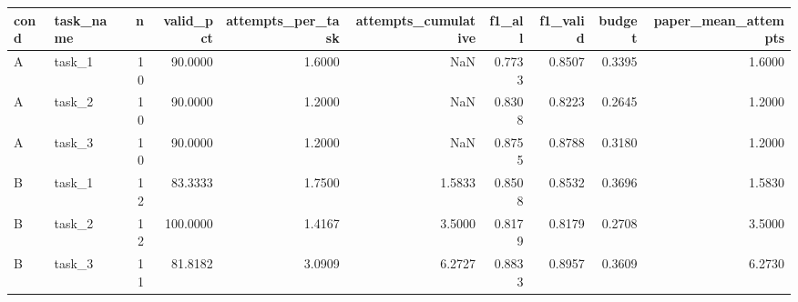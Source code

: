 \begin{tabular}{llrrrrrrrr}
\toprule
cond & task\_name &  n &  valid\_pct &  attempts\_per\_task &  attempts\_cumulative &  f1\_all &  f1\_valid &  budget &  paper\_mean\_attempts \\
\midrule
   A &    task\_1 & 10 &    90.0000 &             1.6000 &                  NaN &  0.7733 &    0.8507 &  0.3395 &               1.6000 \\
   A &    task\_2 & 10 &    90.0000 &             1.2000 &                  NaN &  0.8308 &    0.8223 &  0.2645 &               1.2000 \\
   A &    task\_3 & 10 &    90.0000 &             1.2000 &                  NaN &  0.8755 &    0.8788 &  0.3180 &               1.2000 \\
   B &    task\_1 & 12 &    83.3333 &             1.7500 &               1.5833 &  0.8508 &    0.8532 &  0.3696 &               1.5830 \\
   B &    task\_2 & 12 &   100.0000 &             1.4167 &               3.5000 &  0.8179 &    0.8179 &  0.2708 &               3.5000 \\
   B &    task\_3 & 11 &    81.8182 &             3.0909 &               6.2727 &  0.8833 &    0.8957 &  0.3609 &               6.2730 \\
\bottomrule
\end{tabular}

